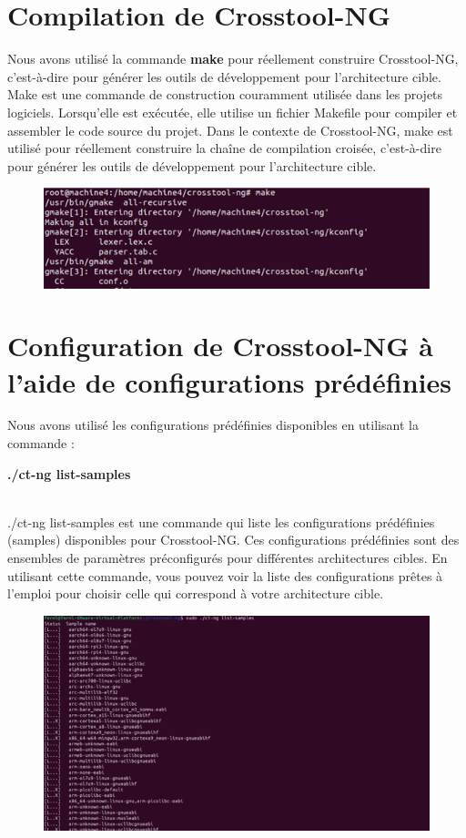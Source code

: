 \section{Compilation de Crosstool-NG }
Nous avons utilisé la commande \textbf{make} pour réellement construire Crosstool-NG, c'est-à-dire pour générer les outils de développement pour l'architecture cible.
\\Make est une commande de construction couramment utilisée dans les projets logiciels. Lorsqu'elle est exécutée, elle utilise un fichier Makefile pour compiler et assembler le code source du projet. 
\newpage
Dans le contexte de Crosstool-NG, make est utilisé pour réellement construire la chaîne de compilation croisée, c'est-à-dire pour générer les outils de développement pour l'architecture cible.
\begin{figure}[h]
    
    \includegraphics[width=1\textwidth]{images/11.png}   
\end{figure}

\section{Configuration de Crosstool-NG à l'aide de configurations prédéfinies}
Nous avons utilisé les configurations prédéfinies disponibles en utilisant la commande :

\textbf{./ct-ng list-samples }

\\ ./ct-ng list-samples est une commande qui liste les configurations prédéfinies (samples) disponibles pour Crosstool-NG. Ces configurations prédéfinies sont des ensembles de paramètres préconfigurés pour différentes architectures cibles. En utilisant cette commande, vous pouvez voir la liste des configurations prêtes à l'emploi pour choisir celle qui correspond à votre architecture cible.
\begin{figure}[h]
    \includegraphics[width=1\textwidth]{images/12.png}   
\end{figure}

